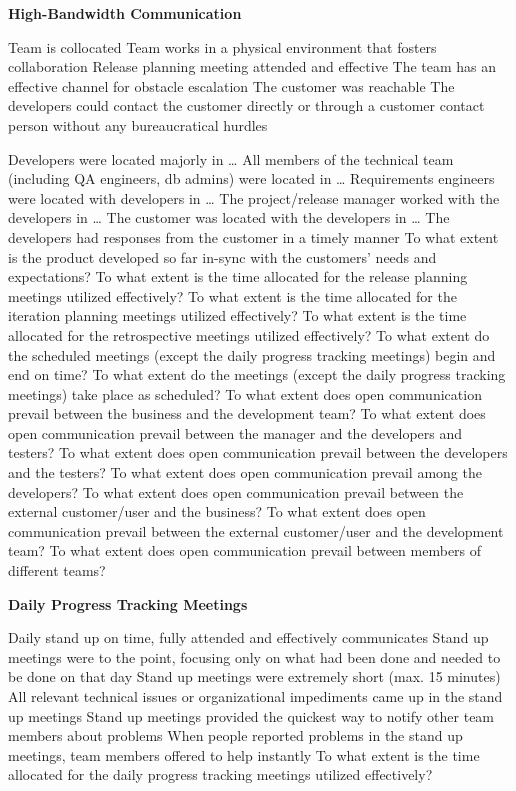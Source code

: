 \textbf{High-Bandwidth Communication}
\begin{itemize}
	\taa Team is collocated
	\taa Team works in a physical environment that fosters collaboration
	\taa Release planning meeting attended and effective
	\taar The team has an effective channel for obstacle escalation
	\pam The customer was reachable
	\pam The developers could contact the customer directly or through a customer contact person without any bureaucratical hurdles

	\pam Developers were located majorly in \ldots
	\pam All members of the technical team (including QA engineers, db admins) were located in \ldots
	\pam Requirements engineers were located with developers in \ldots
	\pam The project/release manager worked with the developers in \ldots
	\pam The customer was located with the developers in \ldots
	\pamr The developers had responses from the customer in a timely manner
	\ops To what extent is the product developed so far in-sync with the customers' needs and expectations?
	\ops To what extent is the time allocated for the release planning meetings utilized effectively?
	\ops To what extent is the time allocated for the iteration planning meetings utilized effectively?
	\ops To what extent is the time allocated for the retrospective meetings utilized effectively?
	\ops To what extent do the scheduled meetings (except the daily progress tracking meetings) begin and end on time?
	\ops To what extent do the meetings (except the daily progress tracking meetings) take place as scheduled? 
	\ops To what extent does open communication prevail between the business and the development team? 
	\ops To what extent does open communication prevail between the manager and the developers and testers? 
	\ops To what extent does open communication prevail between the developers and the testers? 
	\ops To what extent does open communication prevail among the developers? 
	\ops To what extent does open communication prevail between the external customer/user and the business? 
	\ops To what extent does open communication prevail between the external customer/user and the development team?
	\ops To what extent does open communication prevail between members of different teams? 
\end{itemize}

\textbf{Daily Progress Tracking Meetings}
\begin{itemize}
	\taar Daily stand up on time, fully attended and effectively communicates
	\pam Stand up meetings were to the point, focusing only on what had been done and needed to be done on that day
	\pamr Stand up meetings were extremely short (max. 15 minutes)
	\pamr All relevant technical issues or organizational impediments came up in the stand up meetings
	\pamr Stand up meetings provided the quickest way to notify other team members about problems
	\pamr When people reported problems in the stand up meetings, team members offered to help instantly
	\ops To what extent is the time allocated for the daily progress tracking meetings utilized effectively?
\end{itemize}

